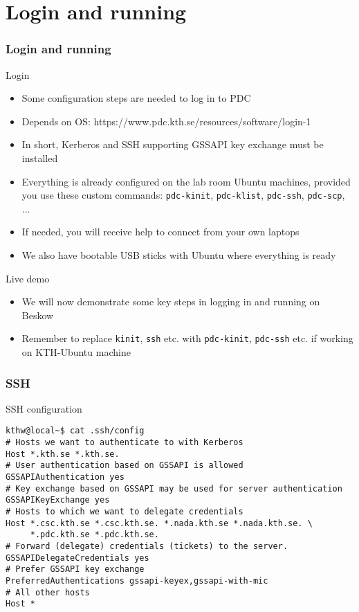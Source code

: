 \section*{Login and running}

\begin{frame}[fragile]
  \frametitle{Login and running}

\footnotesize
\begin{exampleblock}{\large{Login}}
\begin{itemize}
  \item Some configuration steps are needed to log in to PDC 
  \item Depends on OS: https://www.pdc.kth.se/resources/software/login-1
  \item In short, Kerberos and SSH supporting GSSAPI key exchange must be installed 
  \item Everything is already configured on the lab room Ubuntu machines, \alert{provided you use these custom commands:} \verb|pdc-kinit|, \verb|pdc-klist|, \verb|pdc-ssh|, \verb|pdc-scp|, ...
  \item If needed, you will receive help to connect from your own laptops
  \item We also have bootable USB sticks with Ubuntu where everything is ready
\end{itemize}
\end{exampleblock}

\begin{exampleblock}{\large{Live demo}}
\begin{itemize}
  \item We will now demonstrate some key steps in logging in and running on Beskow
  \item Remember to replace \verb|kinit|, \verb|ssh| etc. with \verb|pdc-kinit|, \verb|pdc-ssh| etc. if working on KTH-Ubuntu machine
\end{itemize}
\end{exampleblock}

\end{frame}


\begin{frame}[fragile]
  \frametitle{SSH}
  \begin{alertblock}{SSH configuration}
    \verbatimfont{\footnotesize}
    \begin{verbatim}
kthw@local~$ cat .ssh/config
# Hosts we want to authenticate to with Kerberos
Host *.kth.se *.kth.se.
# User authentication based on GSSAPI is allowed
GSSAPIAuthentication yes
# Key exchange based on GSSAPI may be used for server authentication
GSSAPIKeyExchange yes
# Hosts to which we want to delegate credentials
Host *.csc.kth.se *.csc.kth.se. *.nada.kth.se *.nada.kth.se. \
     *.pdc.kth.se *.pdc.kth.se.
# Forward (delegate) credentials (tickets) to the server.
GSSAPIDelegateCredentials yes
# Prefer GSSAPI key exchange
PreferredAuthentications gssapi-keyex,gssapi-with-mic
# All other hosts
Host *

 \end{verbatim}
\end{alertblock}

\end{frame}

